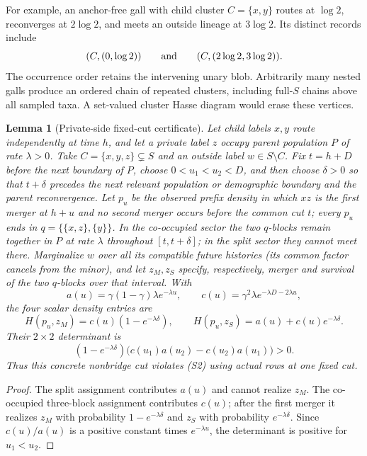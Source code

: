 \documentclass[11pt]{article}
\newtheorem{lemma}[theorem]{Lemma}
\begin{document}
For example, an anchor-free gall with child cluster $C=\{x,y\}$ routes at $\log 2$, reconverges at $2\log 2$, and meets an outside lineage at $3\log 2$.  Its distinct records include
\[
(C,(0,\log 2))\qquad\hbox{and}\qquad(C,(2\log 2,3\log 2)).
\]
The occurrence order retains the intervening unary blob.  Arbitrarily many nested galls produce an ordered chain of repeated clusters, including full-$S$ chains above all sampled taxa.  A set-valued cluster Hasse diagram would erase these vertices.

\begin{lemma}[Private-side fixed-cut certificate]
\label{lem:private-minor}
Let child labels $x,y$ route independently at time $h$, and let a private label $z$ occupy parent population $P$ of rate $\lambda>0$.  Take $C=\{x,y,z\}\subsetneq S$ and an outside label $w\in S\setminus C$.  Fix $t=h+D$ before the next boundary of $P$, choose $0<u_1<u_2<D$, and then choose $\delta>0$ so that $t+\delta$ precedes the next relevant population or demographic boundary and the parent reconvergence.  Let $p_u$ be the observed prefix density in which $xz$ is the first merger at $h+u$ and no second merger occurs before the common cut $t$; every $p_u$ ends in $q=\{\{x,z\},\{y\}\}$.  In the co-occupied sector the two $q$-blocks remain together in $P$ at rate $\lambda$ throughout $[t,t+\delta]$; in the split sector they cannot meet there.  Marginalize $w$ over all its compatible future histories (its common factor cancels from the minor), and let $z_M,z_S$ specify, respectively, merger and survival of the two $q$-blocks over that interval.  With
\[
a(u)=\gamma(1-\gamma)\lambda e^{-\lambda u},\qquad
c(u)=\gamma^2\lambda e^{-\lambda D-2\lambda u},
\]
the four scalar density entries are
\[
H(p_u,z_M)=c(u)(1-e^{-\lambda\delta}),\qquad
H(p_u,z_S)=a(u)+c(u)e^{-\lambda\delta}.
\]
Their $2\times2$ determinant is
\[
(1-e^{-\lambda\delta})\bigl(c(u_1)a(u_2)-c(u_2)a(u_1)\bigr)>0.
\]
Thus this concrete nonbridge cut violates (S2) using actual rows at one fixed cut.
\end{lemma}

\begin{proof}
The split assignment contributes $a(u)$ and cannot realize $z_M$.  The co-occupied three-block assignment contributes $c(u)$; after the first merger it realizes $z_M$ with probability $1-e^{-\lambda\delta}$ and $z_S$ with probability $e^{-\lambda\delta}$.  Since $c(u)/a(u)$ is a positive constant times $e^{-\lambda u}$, the determinant is positive for $u_1<u_2$.
\end{proof}
\end{document}
